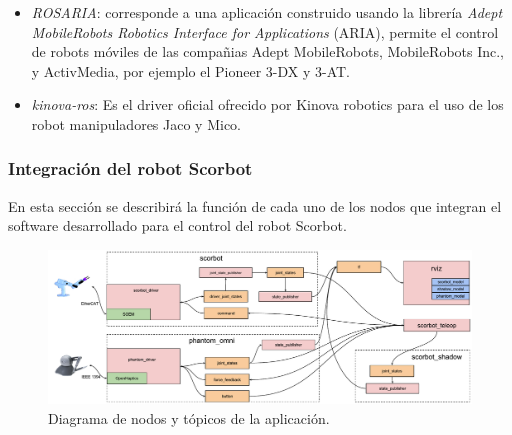 \begin{itemize}

\item \textit{ROSARIA}\cite{rosaria}: corresponde a una aplicación construido usando la librería \textit{Adept MobileRobots Robotics Interface for Applications} (ARIA), permite el control de robots móviles de las compañias Adept MobileRobots, MobileRobots Inc., y ActivMedia, por ejemplo el Pioneer 3-DX y 3-AT.

\item \textit{kinova-ros}\cite{kinova}: Es el driver oficial ofrecido por Kinova robotics para el uso de los robot manipuladores Jaco y Mico.

\end{itemize}

\subsubsection{Integración del robot Scorbot}

En esta sección se describirá la función de cada uno de los nodos que integran el software desarrollado para el control del robot Scorbot.

\begin{figure}[ht]
  \centering
  \includegraphics[width=\textwidth]{img/cap4/scorbot_software.pdf}
  \caption{Diagrama de nodos y tópicos de la aplicación.}
  \label{cap4_scorbot_software}
\end{figure}

